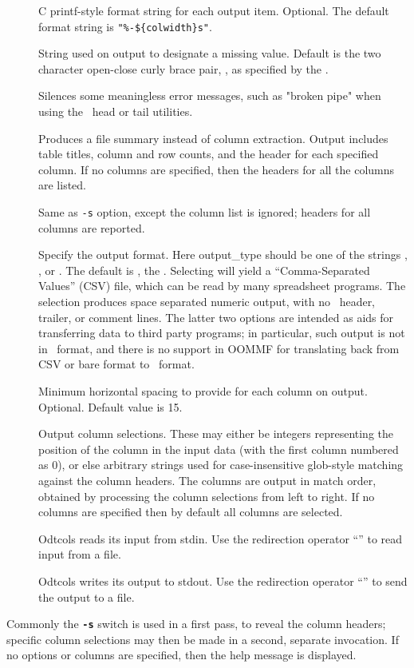 \begin{description}
\item[]
  C printf-style format string for each output item.  Optional.  The
  default format string is \verb+"%-${colwidth}s"+.
\item[]
  String used on output to designate a missing value.  Default
  is the two character open-close curly brace pair, \ocb\ccb, as
  specified by the .
\item[]
  Silences some meaningless error messages, such as "broken pipe" when
  using the \Unix\ head or tail utilities.
\item[]
  Produces a file summary instead of column extraction.  Output includes
  table titles, column and row counts, and the header for each specified
  column.  If no columns are specified, then the headers for all the
  columns are listed.
\item[]
  Same as  \texttt{-s} option, except the column list is ignored;
  headers for all columns are reported.
\item[]
  Specify the output format.  Here output\_type should be one of the
  strings , , or .  The default is ,
  the .  Selecting  will yield a
  ``Comma-Separated Values'' (CSV) file, which can be read by many
  spreadsheet programs.  The  selection produces space separated
  numeric output, with no \ODT\ header, trailer, or comment lines.  The
  latter two options are intended as aids for transferring data to third
  party programs; in particular, such output is not in \ODT\ format, and
  there is no support in OOMMF for translating back from CSV or bare
  format to \ODT\ format.
\item[]
  Minimum horizontal spacing to provide for each column on output.
  Optional.  Default value is 15.
\item[]
  Output column selections.  These may either be integers representing
  the position of the column in the input data (with the first column
  numbered as 0), or else arbitrary strings used for case-insensitive
  glob-style matching against the column headers.  The columns are
  output in match order, obtained by processing the column selections
  from left to right.  If no columns are specified then by default all
  columns are selected.
\item[]
  Odtcols reads its input from stdin.  Use the redirection operator
  ``\boa'' to read input from a file.
\item[]
  Odtcols writes its output to stdout.  Use the redirection operator
  ``\bca'' to send the output to a file.
\end{description}
Commonly the \texttt{\textbf{-s}} switch is used in a first pass, to
reveal the column headers; specific column selections may then be made
in a second, separate invocation.  If no options or columns are
specified, then the help message is displayed.


